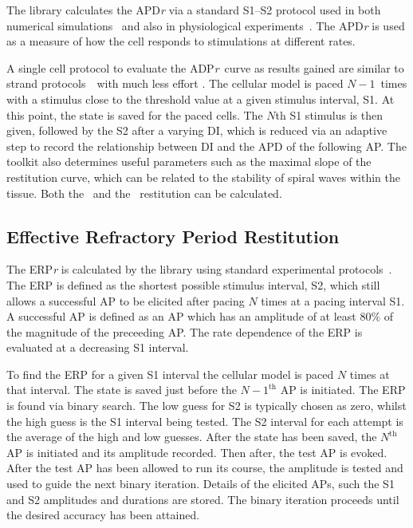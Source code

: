 The library calculates the APD\emph{r} via a standard S1--S2 protocol used in both
numerical simulations~\cite{Kim2002,Xie2002,Qu1999,Cherry2004,Cherry2007,Decker2009} and also in physiological
experiments~\cite{Boyett1978,Taggart1996}.  The APD\emph{r} is used
as a measure of how the cell responds to stimulations at different rates.

A single cell protocol to evaluate the ADP\emph{r}\ curve as results gained are
similar to strand protocols~\cite{Xie2002,Decker2009}\ with much less effort .
The cellular model is paced $N-1$\ times with a stimulus close to the threshold
value at a given stimulus interval, S1.  At this point, the state is saved for the
paced cells.  The $N$th S1 stimulus is then given, followed by the S2 after a
varying DI, which is reduced via an adaptive step to record the relationship
between DI and the APD of the following AP.  The toolkit also determines useful
parameters such as the maximal slope of the restitution curve, which can be
related to the stability of spiral waves within the tissue.  Both the \apdr\ and
the \apdr[50]\ restitution can be calculated.

\subsection{Effective Refractory Period Restitution}

The ERP\emph{r} is calculated by the library using standard experimental
protocols~\cite{Workman2001,Kharche2008}.
The ERP is defined as the shortest possible stimulus interval, S2, which still
allows a successful AP to be elicited after pacing $N$ times at a pacing
interval S1.  A successful AP is defined as an AP which has an amplitude
of at least 80\% of the magnitude of the preceeding AP.  
The rate dependence of the ERP is evaluated at a decreasing S1 interval.

To find the ERP for a given S1 interval the cellular model is paced $N$ times
at that interval.
The state is saved just before the $N-1^{\text{th}}$ AP is initiated.
The ERP is found via binary search.
The low guess for S2 is typically chosen as zero, whilst the high guess is the
S1 interval being tested.
The S2 interval for each attempt is the average of the high and low guesses.
After the state has been saved, the $N^{\text{th}}$ AP is initiated and its
amplitude recorded.
Then  after, the test AP is evoked.
After the test AP has been allowed to run its course, the amplitude is tested
and used to guide the next binary iteration.
Details of the elicited APs, such the S1 and S2 amplitudes and durations are
stored.
The binary iteration proceeds until the desired accuracy has been attained.

